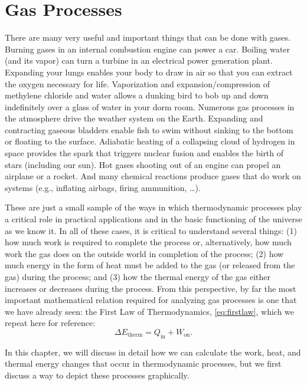 \chapter{Gas Processes}
\label{chap:gas_processes}

There are many very useful and important things that can be done
with gases. Burning gases in an internal combustion engine can power a
car.  Boiling water (and its vapor) can turn a turbine in an
electrical power generation plant. Expanding your lungs enables your 
body to draw in air so that you can extract the oxygen necessary
for life.  Vaporization and expansion/compression of methylene chloride 
and water allows a
dunking bird to bob up and down indefinitely over a glass of water
in your dorm room.  Numerous gas processes in the atmosphere drive the
weather system on the Earth.  Expanding and contracting gaseous
bladders enable fish to swim without sinking to the bottom or 
floating to the surface.  Adiabatic heating of a collapsing cloud 
of hydrogen in space
provides the spark that triggers nuclear fusion and enables the birth
of stars (including our sun). Hot gases shooting out of an engine can
propel an airplane or a rocket.  And many chemical reactions produce
gases that do work on systems (e.g., inflating airbags, firing
ammunition, \dots).

These are just a small sample of the ways in which thermodynamic
processes play a critical role in practical applications and in the
basic functioning of the universe as we know it.  In all of these
cases, it is critical to understand several things: (1) how much work
is required to complete the process or, alternatively, how much work 
the gas does on the outside world in completion of the 
process; (2) how much energy in the form of heat must
be added to the gas (or released from the gas) during the process; and
(3) how the thermal energy of the gas either increases or decreases
during the process.  From this perspective, by far the most important
mathematical relation required for analyzing gas processes is one that
we have already seen: the First Law of Thermodynamics, 
\eqref{eq:firstlaw}, which we repeat here for reference:
\begin{equation}
\Delta E_\text{therm} = Q_\text{in} + W_\text{on}. 
\label{eq:first_law_ch8}
\end{equation}
 
In this chapter, we will discuss in detail how we can calculate the work,
heat, and thermal energy changes that occur in thermodynamic processes, but 
we first discuss a way to depict these processes graphically.

